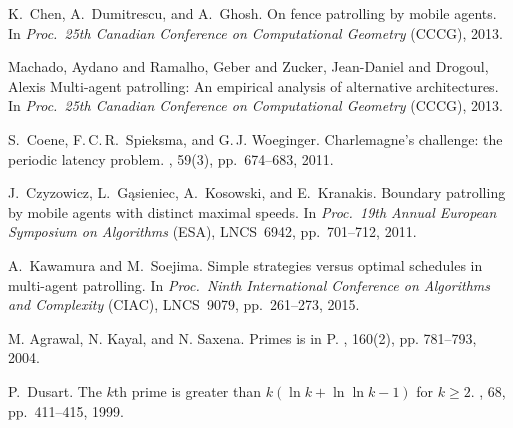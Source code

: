 \begin{thebibliography}{1}




K.~Chen, A.~Dumitrescu, and A.~Ghosh.
\newblock On fence patrolling by mobile agents.
\newblock In {\it Proc.\ 25th Canadian Conference on Computational Geometry} (CCCG), 2013.

Machado, Aydano and Ramalho, Geber and Zucker, Jean-Daniel and Drogoul, Alexis
\newblock Multi-agent patrolling: An empirical analysis of alternative architectures.
\newblock In {\it Proc.\ 25th Canadian Conference on Computational Geometry} (CCCG), 2013.




S.~Coene, F.\,C.\,R.~Spieksma, and G.\,J. Woeginger.
\newblock Charlemagne's challenge: the periodic latency problem.
, 59(3), pp.~674--683, 2011.


J.~Czyzowicz, L.~G{\k{a}}sieniec, A.~Kosowski, and E.~Kranakis.
\newblock Boundary patrolling by mobile agents with distinct maximal speeds.
\newblock In {\it Proc.\ 19th Annual European Symposium on Algorithms} (ESA), LNCS~6942, pp.~701--712, 2011. 




A.~Kawamura and M.~Soejima.
\newblock Simple strategies versus optimal schedules in multi-agent patrolling.
\newblock In \emph{Proc.\ Ninth International Conference on Algorithms and Complexity} (CIAC), LNCS~9079, pp.~261--273, 2015.



M. Agrawal, N. Kayal, and N. Saxena.
\newblock Primes is in P.
, 160(2), pp. 781--793, 2004.

P.~Dusart.
\newblock The $k$th prime is greater than $k (\ln k + \ln \ln k - 1)$ for $k \geq 2$.
, 68, pp.~411--415, 1999.


\end{thebibliography}
